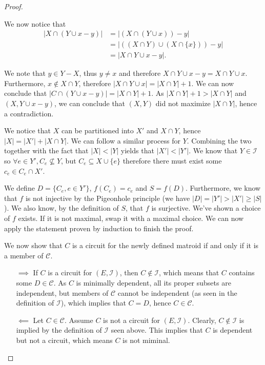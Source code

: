 \begin{proof}
\begin{enumerate}
\begin{enumerate}
            We now notice that
            \begin{align*}
              |X \cap (Y \cup x - y)| &= |(X \cap (Y \cup x)) - y| 
              \\&=  |((X \cap Y) \cup (X \cap \{x\})) - y|
              \\&=  |X \cap Y \cup x - y|.
            \end{align*}

              We note that $y \in Y - X$, thus $y \neq x$ and therefore $X \cap Y \cup x - y = X \cap Y \cup x$. Furthermore, $x \not\in X \cap Y$, therefore $|X \cap Y \cup x| = |X \cap Y| + 1$. We can now conclude that $|C \cap (Y \cup x - y)| = |X \cap Y| + 1$. As $|X \cap Y| + 1 > |X \cap Y|$ and $(X, Y \cup x - y)$, we can conclude that $(X, Y)$ did not maximize $|X \cap Y|$, hence a contradiction.
    \end{enumerate}

    We notice that $X$ can be partitioned into $X'$ and $X \cap Y$, hence $|X| = |X'| + |X \cap Y|$. We can follow a similar process for $Y$. Combining the two together with the fact that $|X| < |Y|$ yields that $|X'| < |Y'|$. We know that $Y \in \mathcal I$ so $\forall e \in Y', C_e \not \subseteq  Y$, but $C_e \subseteq  X \cup \{e\}$ therefore there must exist some $c_e \in C_e \cap X'$. 

    We define $D = \{C_e, e \in Y'\}$, $f(C_e) = c_e$ and $S = f(D)$. Furthermore, we know that $f$ is not injective by the Pigeonhole principle (we have $|D| = |Y'| > |X'| \geq |S|$). We also know, by the definition of $S$, that $f$ is surjective. We've shown a choice of $f$ exists. If it is not maximal, swap it with a maximal choice. We can now apply the statement proven by induction to finish the proof.
\end{enumerate}


We now show that $C$ is a circuit for the newly defined matroid if and only if it is a member of $\mathcal C$. 
\begin{enumerate}
  \item[$\implies$]
    If $C$ is a circuit for $(E, \mathcal I)$, then $C \not\in \mathcal I$, which means that $C$ contains some $D \in \mathcal C$. As $C$ is minimally dependent, all its proper subsets are independent, but members of $\mathcal C$ cannot be independent (as seen in the definition of $\mathcal I$), which implies that $C = D$, hence $C \in \mathcal C$.
  \item[$\impliedby$]
    Let $C \in \mathcal C$. Assume $C$ is not a circuit for $(E, \mathcal I)$. Clearly, $C \not\in \mathcal I$ is implied by the definition of $\mathcal I$ seen above. This implies that $C$ is dependent but not a circuit, which means $C$ is not miminal. 


\end{enumerate}
\end{proof}
